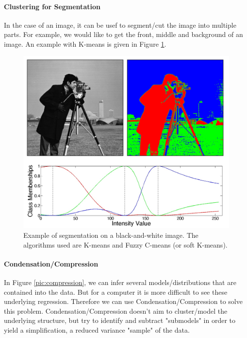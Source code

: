\paragraph{Clustering for Segmentation}
In the case of an image, it can be usef to segment/cut the image into multiple parts. For example, we would like to get the front, middle and background of an image. An example with K-means is given in Figure \ref{pic:segmentation}.

\begin{figure}[H]%
 \centering
 \includegraphics[width=13cm]{./img/09/segmentation}
 \caption{\label{pic:segmentation} Example of segmentation on a black-and-white image. The algorithms used are K-means and Fuzzy C-means (or soft K-means).}
\end{figure}

\paragraph{Condensation/Compression} 

In Figure \ref{pic:compression}, we can infer several models/distributions that are contained into the data. But for a computer it is more difficult to see these underlying regression. Therefore we can use Condensation/Compression to solve this problem. Condensation/Compression doesn't aim to cluster/model the underlying structure, but try to identify and subtract "submodels" in order to yield a simplification, a reduced variance "sample" of the data.

